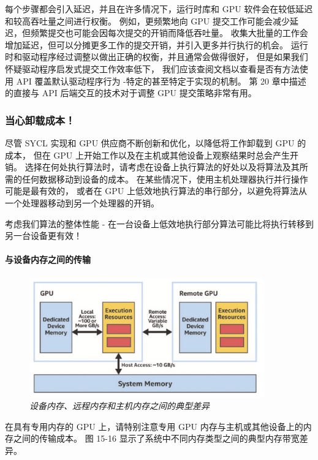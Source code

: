 每个步骤都会引入延迟，并且在许多情况下，运行时库和 GPU 软件会在较低延迟和较高吞吐量之间进行权衡。 
例如，更频繁地向 GPU 提交工作可能会减少延迟，但频繁提交也可能会因每次提交的开销而降低吞吐量。 
收集大批量的工作会增加延迟，但可以分摊更多工作的提交开销，并引入更多并行执行的机会。 
运行时和驱动程序经过调整以做出正确的权衡，并且通常会做得很好，
但是如果我们怀疑驱动程序启发式提交工作效率低下，
我们应该查阅文档以查看是否有方法使用 API 覆盖默认驱动程序行为 -特定的甚至特定于实现的机制。 
第 20 章中描述的直接与 API 后端交互的技术对于调整 GPU 提交策略非常有用。

\subsubsection{当心卸载成本！}
尽管 SYCL 实现和 GPU 供应商不断创新和优化，以降低将工作卸载到 GPU 的成本，
但在 GPU 上开始工作以及在主机或其他设备上观察结果时总会产生开销。 
选择在何处执行算法时，请考虑在设备上执行算法的好处以及将算法及其所需的任何数据移动到设备的成本。 
在某些情况下，使用主机处理器执行并行操作可能是最有效的，
或者在 GPU 上低效地执行算法的串行部分，以避免将算法从一个处理器移动到另一个处理器的开销。

\begin{remark}
	考虑我们算法的整体性能 - 在一台设备上低效地执行部分算法可能比将执行转移到另一台设备更有效！
\end{remark}

\paragraph{与设备内存之间的传输}

\begin{figure}[H]
	\centering
	\includegraphics[width=0.9\textwidth]{figs/F15.16.png}
	\caption{\textit{设备内存、远程内存和主机内存之间的典型差异}}
\end{figure}

在具有专用内存的 GPU 上，请特别注意专用 GPU 内存与主机或其他设备上的内存之间的传输成本。 
图 15-16 显示了系统中不同内存类型之间的典型内存带宽差异。

